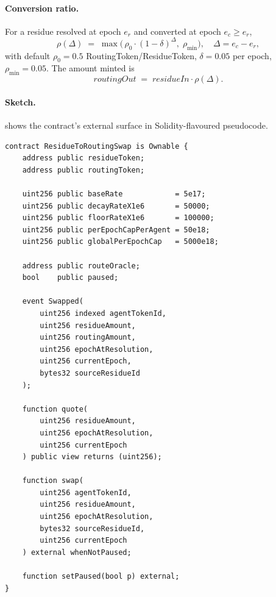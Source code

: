 \documentclass[11pt,twocolumn]{article}
\theoremstyle{definition}
\theoremstyle{plain}
\theoremstyle{remark}
\newcommand{\contractname}[1]{\textsc{#1}}
\begin{document}
\paragraph{Conversion ratio.} For a residue resolved at epoch $e_r$ and converted at epoch $e_c \ge e_r$,
\begin{equation}\label{eq:swap}
\rho(\Delta) \;=\; \max\!\bigl(\,\rho_0\cdot(1-\delta)^{\Delta},\; \rho_{\min}\bigr), \quad \Delta = e_c - e_r,
\end{equation}
\noindent with default $\rho_0 = 0.5$ RoutingToken/ResidueToken, $\delta = 0.05$ per epoch, $\rho_{\min} = 0.05$. The amount minted is
\begin{equation*}
\mathit{routingOut} \;=\; \mathit{residueIn} \cdot \rho(\Delta).
\end{equation*}

\paragraph{Sketch.}  shows the contract's external surface in Solidity-flavoured pseudocode.

\begin{lstlisting}[caption={\contractname{ResidueToRoutingSwap} interface (abridged).},label={lst:swap}]
contract ResidueToRoutingSwap is Ownable {
    address public residueToken;
    address public routingToken;

    uint256 public baseRate            = 5e17;
    uint256 public decayRateX1e6       = 50000;
    uint256 public floorRateX1e6       = 100000;
    uint256 public perEpochCapPerAgent = 50e18;
    uint256 public globalPerEpochCap   = 5000e18;

    address public routeOracle;
    bool    public paused;

    event Swapped(
        uint256 indexed agentTokenId,
        uint256 residueAmount,
        uint256 routingAmount,
        uint256 epochAtResolution,
        uint256 currentEpoch,
        bytes32 sourceResidueId
    );

    function quote(
        uint256 residueAmount,
        uint256 epochAtResolution,
        uint256 currentEpoch
    ) public view returns (uint256);

    function swap(
        uint256 agentTokenId,
        uint256 residueAmount,
        uint256 epochAtResolution,
        bytes32 sourceResidueId,
        uint256 currentEpoch
    ) external whenNotPaused;

    function setPaused(bool p) external;
}
\end{lstlisting}
\end{document}
